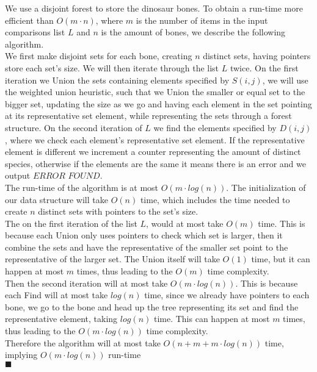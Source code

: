 \documentclass[20pt]{article}
\begin{document}
\noindent
\begin{text}
    We use a disjoint forest to store the dinosaur bones. To obtain a run-time more efficient than $O(m \cdot 
    n)$, where $m$ is the number of items in the input comparisons list $L$ and $n$ is the amount of bones, we describe the following algorithm.\\
    
    \noindent
    We first make disjoint sets for each bone, creating $n$ distinct sets, having pointers store each set's size. We will then iterate through the list $L$ twice. On the first iteration we Union the sets containing elements specified by $S(i,j)$, we will use the weighted union heuristic, such that we Union the smaller or equal set to the bigger set, updating the size as we go and having each element in the set pointing at its representative set element, while representing the sets through a forest structure. On the second iteration of $L$ we find the elements specified by $D(i,j)$, where we check each element's representative set element. If the representative element is different we increment a counter representing the amount of distinct species, otherwise if the elements are the same it means there is an error and we output $ERROR \,\, FOUND$.\\
    
    \noindent
    The run-time of the algorithm is at most $O(m \cdot log(n))$. The initialization of our data structure will take $O(n)$ time, which includes the time needed to create $n$ distinct sets with pointers to the set's size.\\
    
    \noindent
    The on the first iteration of the list $L$, would at most take $O(m)$ time. This is because each Union only uses pointers to check which set is larger, then it combine the sets and have the representative of the smaller set point to the representative of the larger set. The Union itself will take $O(1)$ time, but it can happen at most $m$ times, thus leading to the $O(m)$ time complexity.\\
    
    \noindent
    Then the second iteration will at most take $O(m \cdot log(n))$. This is because each Find will at most take $log(n)$ time, since we already have pointers to each bone, we go to the bone and head up the tree representing its set and find the representative element, taking $log(n)$ time. This can happen at most $m$ times, thus leading to the $O(m \cdot log(n))$ time complexity.\\
    
    \noindent
    Therefore the algorithm will at most take $O(n + m + m \cdot log(n))$ time, implying $O(m \cdot log(n))$ run-time\\
    
    \hfill $\blacksquare$
\end{text}

\end{document}
